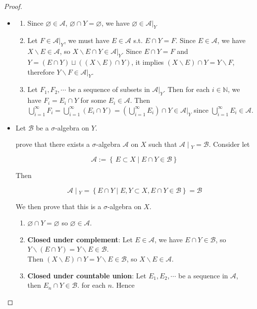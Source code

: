 \documentclass{qlnotes-export}
\begin{document}
\begin{proof}

\begin{itemize}
\item
  \begin{enumerate}
  \item
    Since \(\varnothing \in \mathcal{A}\), \(\varnothing \cap Y = \varnothing\), we have \(\varnothing \in \mathcal{A}|_{Y}\)
  \item
    Let \(F \in \mathcal{A}|_{Y}\), we must have \(E \in \mathcal{A}\) s.t. \(E \cap Y = F\). Since \(E \in \mathcal{A}\), we have \(X\backslash E \in \mathcal{A}\), so \(X\backslash E \cap Y \in \mathcal{A}|_{Y}\). Since \(E \cap Y = F\) and \(Y = (E \cap Y) \sqcup ((X\backslash E) \cap Y)\), it implies \((X\backslash E) \cap Y = Y\backslash F\), therefore \(Y\backslash F \in \mathcal{A}|_{Y}\).
  \item
    Let \(F_{1},F_{2},\cdots\) be a sequence of subsets in \(\mathcal{A}|_{Y}\). Then for each \(i \in {\mathbb{N}}\), we have \(F_{i} = E_{i} \cap Y\) for some \(E_{i} \in \mathcal{A}\). Then \(\bigcup_{i = 1}^{\infty}F_{i} = \bigcup_{i = 1}^{\infty}(E_{i} \cap Y) = (\bigcup_{i = 1}^{\infty}E_{i}) \cap Y \in \mathcal{A}|_{Y}\) since \(\bigcup_{i = 1}^{\infty}E_{i} \in \mathcal{A}\).
  \end{enumerate}
\item
  Let \(\mathcal{B}\) be a \(\sigma\)-algebra on \(Y\).

  prove that there exists a \(\sigma\)-algebra \(\mathcal{A}\) on \(X\) such that \(\left. \mathcal{A} \middle| {}_{Y} = \mathcal{B} \right.\). Consider let

  \[\mathcal{A} := \left\{ {\, E \subset X \mid E \cap Y \in \mathcal{B}} \right\}\]

  Then

  \[\left. \mathcal{A} \middle| {}_{Y} = \left\{ {E \cap Y \mid E,Y \subset X,E \cap Y \in \mathcal{B}} \right\} = \mathcal{B} \right.\]

  We then prove that this is a \(\sigma\)-algebra on \(X\).\\

  \begin{enumerate}
  \item
    \(\varnothing \cap Y = \varnothing\) so \(\varnothing \in \mathcal{A}\).
  \item
    \textbf{Closed under complement}: Let \(E \in \mathcal{A}\), we have \(E \cap Y \in \mathcal{B}\), so \(Y\backslash(E \cap Y) = Y\backslash E \in \mathcal{B}\).\\
    Then \((X\backslash E) \cap Y = Y\backslash E \in \mathcal{B}\), so \(X\backslash E \in \mathcal{A}\).
  \item
    \textbf{Closed under countable union}: Let \(E_{1},E_{2},\cdots\) be a sequence in \(\mathcal{A}\), then \(E_{n} \cap Y \in \mathcal{B}\). for each \(n\). Hence


\end{enumerate}
\end{itemize}
\end{proof}
\end{document}
